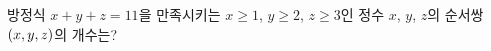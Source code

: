 방정식 $x+y+z=11$을 만족시키는 $x\ge 1$, $y\ge 2$, $z\ge 3$인 정수 $x$, $y$, $z$의 순서쌍 $(x{,}\mkern3mu\mathopen{}y{,}\mkern3mu\mathopen{}z)$의 개수는?
